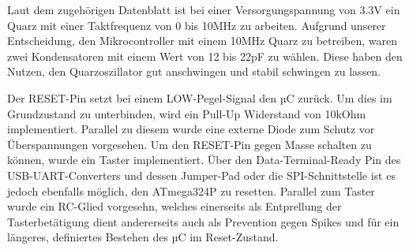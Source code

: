 Laut dem zugehörigen Datenblatt ist bei einer Versorgungspannung von 3.3V ein Quarz mit einer Taktfrequenz von 0 bis 10MHz zu arbeiten.
Aufgrund unserer Entscheidung, den Mikrocontroller mit einem 10MHz Quarz zu betreiben, waren zwei Kondensatoren mit einem Wert von 12 bis 22pF zu wählen.
Diese haben den Nutzen, den Quarzoszillator gut anschwingen und stabil schwingen zu lassen.

Der RESET-Pin setzt bei einem LOW-Pegel-Signal den µC zurück.
Um dies im Grundzustand zu unterbinden, wird ein Pull-Up Widerstand von 10kOhm implementiert.
Parallel zu diesem wurde eine externe Diode zum Schutz vor Überspannungen vorgesehen.
Um den RESET-Pin gegen Masse schalten zu können, wurde ein Taster implementiert.
Über den Data-Terminal-Ready Pin des USB-UART-Converters und dessen Jumper-Pad oder die SPI-Schnittstelle ist es jedoch ebenfalls möglich, den ATmega324P zu resetten.
Parallel zum Taster wurde ein RC-Glied vorgesehn, welches einerseits als Entprellung der Tasterbetätigung dient
andererseits auch als Prevention gegen Spikes und für ein längeres, definiertes Bestehen des µC im Reset-Zustand.


